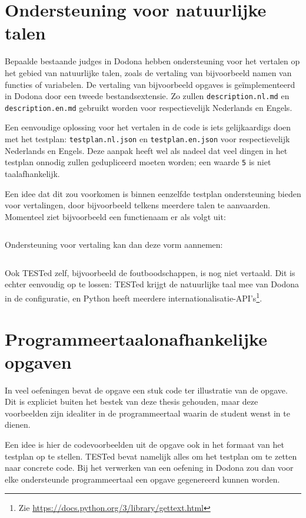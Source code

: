 \section{Ondersteuning voor natuurlijke talen}\label{sec:ondersteuning-voor-natuurlijke-talen}

Bepaalde bestaande judges in Dodona hebben ondersteuning voor het vertalen op het gebied van natuurlijke talen, zoals de vertaling van bijvoorbeeld namen van functies of variabelen.
De vertaling van bijvoorbeeld opgaves is geïmplementeerd in Dodona door een tweede bestandsextensie.
Zo zullen \texttt{description.nl.md} en \texttt{description.en.md} gebruikt worden voor respectievelijk Nederlands en Engels.

Een eenvoudige oplossing voor het vertalen in de code is iets gelijkaardigs doen met het testplan: \texttt{testplan.nl.json} en \texttt{testplan.en.json} voor respectievelijk Nederlands en Engels.
Deze aanpak heeft wel als nadeel dat veel dingen in het testplan onnodig zullen gedupliceerd moeten worden;
een waarde \texttt{5} is niet taalafhankelijk.

Een idee dat dit zou voorkomen is binnen eenzelfde testplan ondersteuning bieden voor vertalingen, door bijvoorbeeld telkens meerdere talen te aanvaarden.
Momenteel ziet bijvoorbeeld een functienaam er als volgt uit:

\inputminted{json}{code/example-name.json}

Ondersteuning voor vertaling kan dan deze vorm aannemen:

\inputminted{json}{code/example-name-trans.json}

Ook TESTed zelf, bijvoorbeeld de foutboodschappen, is nog niet vertaald.
Dit is echter eenvoudig op te lossen: TESTed krijgt de natuurlijke taal mee van Dodona in de configuratie, en Python heeft meerdere internationalisatie-API's\footnote{Zie \url{https://docs.python.org/3/library/gettext.html}}.

\section{Programmeertaalonafhankelijke opgaven}\label{sec:programmeertaalonafhankelijke-opgaven}

In veel oefeningen bevat de opgave een stuk code ter illustratie van de opgave.
Dit is expliciet buiten het bestek van deze thesis gehouden, maar deze voorbeelden zijn idealiter in de programmeertaal waarin de student wenst in te dienen.

Een idee is hier de codevoorbeelden uit de opgave ook in het formaat van het testplan op te stellen.
TESTed bevat namelijk alles om het testplan om te zetten naar concrete code.
Bij het verwerken van een oefening in Dodona zou dan voor elke ondersteunde programmeertaal een opgave gegenereerd kunnen worden.

